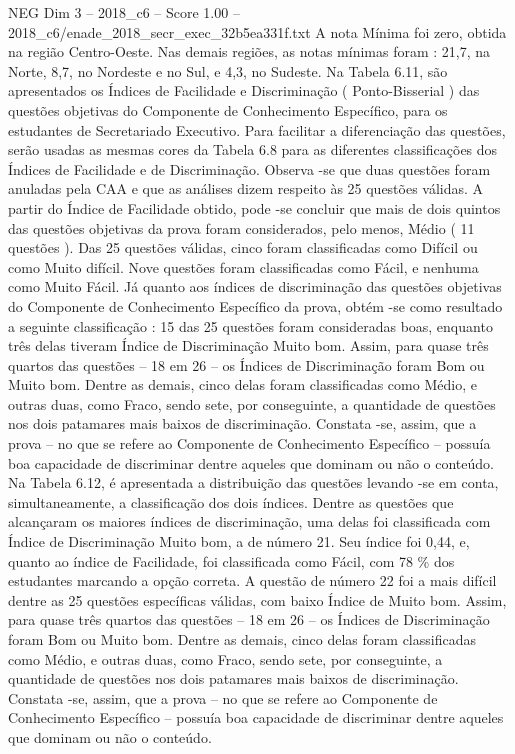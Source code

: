 \begin{textsample}{NEG Dim 3 – 2018\_c6 – Score 1.00 – 2018\_c6/enade\_2018\_secr\_exec\_32b5ea331f.txt}
A nota Mínima foi zero, obtida na região Centro-Oeste.
Nas demais regiões, as notas mínimas foram : 21,7, na Norte, 8,7, no Nordeste e no Sul, e 4,3, no Sudeste.
Na Tabela 6.11, são apresentados os Índices de Facilidade e Discriminação ( Ponto-Bisserial ) das questões objetivas do Componente de Conhecimento Específico, para os estudantes de Secretariado Executivo.
Para facilitar a diferenciação das questões, serão usadas as mesmas cores da Tabela 6.8 para as diferentes classificações dos Índices de Facilidade e de Discriminação.
Observa -se que duas questões foram anuladas pela CAA e que as análises dizem respeito às 25 questões válidas.
A partir do Índice de Facilidade obtido, pode -se concluir que mais de dois quintos das questões objetivas da prova foram considerados, pelo menos, Médio ( 11 questões ).
Das 25 questões válidas, cinco foram classificadas como Difícil ou como Muito difícil.
Nove questões foram classificadas como Fácil, e nenhuma como Muito Fácil.
Já quanto aos índices de discriminação das questões objetivas do Componente de Conhecimento Específico da prova, obtém -se como resultado a seguinte classificação : 15 das 25 questões foram consideradas boas, enquanto três delas tiveram Índice de Discriminação Muito bom.
Assim, para quase três quartos das questões – 18 em 26 – os Índices de Discriminação foram Bom ou Muito bom.
Dentre as demais, cinco delas foram classificadas como Médio, e outras duas, como Fraco, sendo sete, por conseguinte, a quantidade de questões nos dois patamares mais baixos de discriminação.
Constata -se, assim, que a prova – no que se refere ao Componente de Conhecimento Específico – possuía boa capacidade de discriminar dentre aqueles que dominam ou não o conteúdo.
Na Tabela 6.12, é apresentada a distribuição das questões levando -se em conta, simultaneamente, a classificação dos dois índices.
Dentre as questões que alcançaram os maiores índices de discriminação, uma delas foi classificada com Índice de Discriminação Muito bom, a de número 21.
Seu índice foi 0,44, e, quanto ao índice de Facilidade, foi classificada como Fácil, com 78 \% dos estudantes marcando a opção correta.
A questão de número 22 foi a mais difícil dentre as 25 questões específicas válidas, com baixo Índice de Muito bom.
Assim, para quase três quartos das questões – 18 em 26 – os Índices de Discriminação foram Bom ou Muito bom.
Dentre as demais, cinco delas foram classificadas como Médio, e outras duas, como Fraco, sendo sete, por conseguinte, a quantidade de questões nos dois patamares mais baixos de discriminação.
Constata -se, assim, que a prova – no que se refere ao Componente de Conhecimento Específico – possuía boa capacidade de discriminar dentre aqueles que dominam ou não o conteúdo.

\end{textsample}
